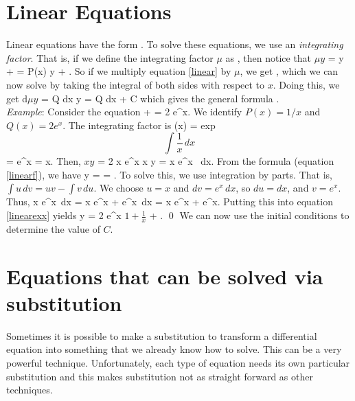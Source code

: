 \documentclass[12pt]{book}
\begin{document}
\section{Linear Equations}

Linear equations have the form
\be \label{linear}
.
\ee
To solve these equations, we use an \emph{integrating factor}. That is, if
we define the integrating factor $\mu$ as
\be
{},
\ee
then notice that
\bee
  \(\mu y \) =  y + \mu {}
  = \mu P(x) y + \mu {}.
\eee
So if we multiply equation \eqref{linear} by $\mu$, we get
\be
{},
\ee
which we can now solve by taking the integral of both sides with respect to
$x$. Doing this, we get
\bee
  d\(\mu y\) = \mu Q dx \qquad \implies \qquad
  \mu y = \int \mu Q dx + C
\eee
which gives the general formula
\be
\label{linearf}
.
\ee
\\

\noindent \emph{Example}:
\label{linearsec}
Consider the equation
\bee
   +  = 2 e^x.
\eee
We identify $P(x)=1/x$ and $Q(x)=2e^x$. The integrating factor is
\bee
  \mu(x) = \mbox{exp}\[\int \frac{1}{x} \, dx \] = e^{\ln x} = x.
\eee
Then,
\be \label{linearex}
   \(x y \) = 2 x e^x
  \quad \implies \quad
  x y =  x e^x \, dx.
\ee
From the formula (equation \eqref{linearf}), we have
\be
\label{linearexx}
y =  = .
\ee
To solve this, we use integration by parts. That is,
$\int u \, dv = uv - \int v\,  du$. We choose $u=x$ and $dv = e^x \, dx$, so
$du = dx$, and $v=e^x$. Thus,
\bee
  \int x e^x \,dx = x e^x + \int e^x \,dx = x e^x + e^x.
\eee
Putting this into equation \eqref{linearexx} yields
\bee
  y = 2 e^x \(1 + \frac{1}{x}\) + . \qed
\eee
We can now use the initial conditions to determine the value of $C$.





\section{Equations that can be solved via substitution}

Sometimes it is possible to make a substitution to transform a differential
equation into something that we already know how to solve. This can be a very
powerful technique. Unfortunately, each type of equation needs its own
particular substitution and this makes substitution not as straight forward as
other techniques.
\end{document}
